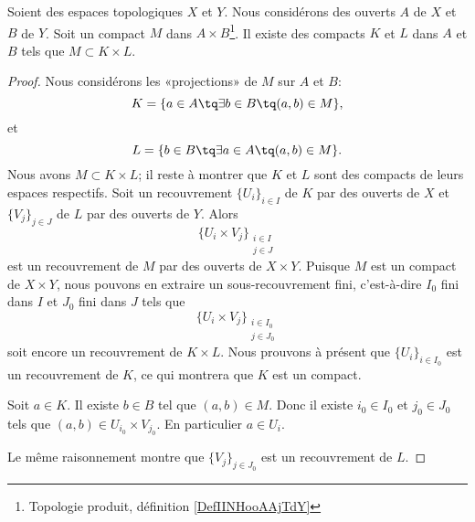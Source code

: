 \begin{proposition}
	Soient des espaces topologiques \( X\) et \( Y\). Nous considérons des ouverts \( A\) de \( X\) et \( B\) de \( Y\). Soit un compact \( M\) dans \( A\times B\)\footnote{Topologie produit, définition \ref{DefIINHooAAjTdY}}. Il existe des compacts \( K\) et \( L\) dans \( A\) et \( B\) tels que \( M\subset K\times L\).
\end{proposition}

\begin{proof}
	Nous considérons les «projections» de \( M\) sur \( A\) et \( B\):
	\begin{equation}
		K=\{ a\in A\tq \exists b\in B\tq (a,b)\in M \},
	\end{equation}
	et
	\begin{equation}
		L=\{ b\in B\tq \exists a\in A\tq (a,b)\in M \}.
	\end{equation}
	Nous avons \( M\subset K\times L\); il reste à montrer que \( K\) et \( L\) sont des compacts de leurs espaces respectifs. Soit un recouvrement \( \{ U_i \}_{i\in I} \) de \( K\) par des ouverts de \( X\) et \( \{ V_j \}_{j\in J}\) de \( L\) par des ouverts de \( Y\). Alors
	\begin{equation}
		\{ U_i\times  V_j \}_{\substack{i\in I\\j\in J}}
	\end{equation}
	est un recouvrement de \( M\) par des ouverts de \( X\times Y\). Puisque \( M\) est un compact de \( X\times Y\), nous pouvons en extraire un sous-recouvrement fini, c'est-à-dire \( I_0\) fini dans \( I\) et \( J_0\) fini dans \( J\) tels que
	\begin{equation}
		\{ U_i\times  V_j \}_{\substack{i\in I_0\\j\in J_0}}
	\end{equation}
	soit encore un recouvrement de \( K\times L\). Nous prouvons à présent que \( \{ U_i \}_{i\in I_0}\) est un recouvrement de \( K\), ce qui montrera que \( K\) est un compact.

	Soit \( a\in K\). Il existe \( b\in B\) tel que \( (a,b)\in M\). Donc il existe \( i_0\in I_0\) et \( j_0\in J_0\) tels que \( (a,b)\in U_{i_0}\times V_{j_0}\). En particulier \( a\in U_i\).

	Le même raisonnement montre que \( \{ V_j \}_{j\in J_0}\) est un recouvrement de \( L\).
\end{proof}

